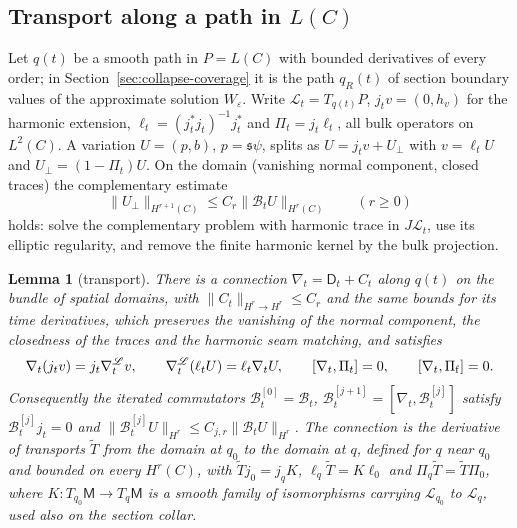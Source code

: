 \documentclass[11pt]{amsart}
\newtheorem{lemma}[theorem]{Lemma}
\theoremstyle{definition}
\theoremstyle{remark}
\theoremstyle{plain}
\numberwithin{equation}{section}
\newcommand{\Msf}{\mathsf{M}}
\newcommand{\eps}{\varepsilon}
\begin{document}
\subsection{Transport along a path in $L(C)$}\label{subsec:transport}

Let $q(t)$ be a smooth path in $P=L(C)$ with bounded derivatives of every order;
in Section~\ref{sec:collapse-coverage} it is the path $q_R(t)$ of section boundary
values of the approximate solution $W_\eps$. Write
$\mathscr L_t=T_{q(t)}P$, $j_tv=(0,h_v)$ for the harmonic extension,
$\ell_t=(j_t^*j_t)^{-1}j_t^*$ and $\Pi_t=j_t\ell_t$, all bulk operators on
$L^2(C)$. A variation $U=(p,b)$, $p={\mathfrak s}\psi$, splits as $U=j_tv+U_\perp$ with
$v=\ell_tU$ and $U_\perp=(1-\Pi_t)U$. On the domain (vanishing normal component,
closed traces) the complementary estimate
\begin{equation}\label{eq:complementary}
\|U_\perp\|_{H^{r+1}(C)}\le C_r\|\mathcal B_tU\|_{H^r(C)}\qquad(r\ge0)
\end{equation}
holds: solve the complementary problem with harmonic trace in $J\mathscr L_t$, use its
elliptic regularity, and remove the finite harmonic kernel by the bulk
projection.

\begin{lemma}[transport]\label{lem:transport}
There is a connection $\nabla_t=\mathsf D_t+C_t$ along $q(t)$ on the bundle of
spatial domains, with $\|C_t\|_{H^r\to H^r}\le C_r$ and the same bounds for its
time derivatives, which preserves the vanishing of the normal component, the
closedness of the traces and the harmonic seam matching, and satisfies
\[
\nabla_t(j_tv)=j_t\nabla^{\mathscr L}_tv,\qquad\nabla^{\mathscr L}_t(\ell_tU)=\ell_t\nabla_tU,\qquad
[\nabla_t,\Pi_t]=0,\qquad[\nabla_t,\Pi_{\rm f}]=0 .
\]
Consequently the iterated commutators $\mathcal B^{[0]}_t=\mathcal B_t$,
$\mathcal B^{[j+1]}_t=[\nabla_t,\mathcal B^{[j]}_t]$ satisfy $\mathcal B^{[j]}_tj_t=0$
and $\|\mathcal B^{[j]}_tU\|_{H^r}\le C_{j,r}\|\mathcal B_tU\|_{H^r}$. The connection is
the derivative of transports $\widetilde T$ from the domain at $q_0$ to the domain at
$q$, defined for $q$ near $q_0$ and bounded on every $H^r(C)$, with
$\widetilde Tj_0=j_qK$, $\ell_q\widetilde T=K\ell_0$ and $\Pi_q\widetilde T=\widetilde T\Pi_0$,
where $K\colon T_{q_0}\Msf\to T_q\Msf$ is a smooth family of isomorphisms carrying
$\mathscr L_{q_0}$ to $\mathscr L_q$, used also on the section collar.
\end{lemma}
\end{document}
